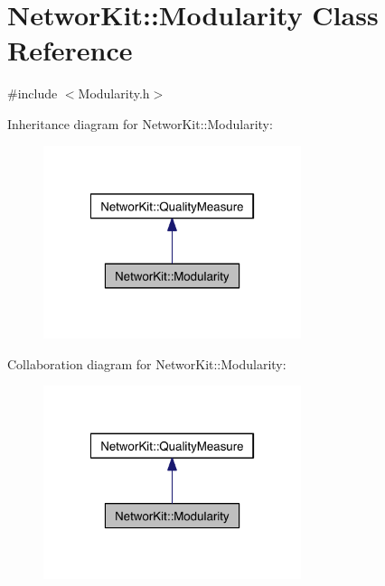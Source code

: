 \hypertarget{class_networ_kit_1_1_modularity}{\section{Networ\-Kit\-:\-:Modularity Class Reference}
\label{class_networ_kit_1_1_modularity}
}


{\ttfamily \#include $<$Modularity.\-h$>$}



Inheritance diagram for Networ\-Kit\-:\-:Modularity\-:\nopagebreak
\begin{figure}[H]
\begin{center}
\leavevmode
\includegraphics[width=214pt]{class_networ_kit_1_1_modularity__inherit__graph}
\end{center}
\end{figure}


Collaboration diagram for Networ\-Kit\-:\-:Modularity\-:\nopagebreak
\begin{figure}[H]
\begin{center}
\leavevmode
\includegraphics[width=214pt]{class_networ_kit_1_1_modularity__coll__graph}
\end{center}
\end{figure}
